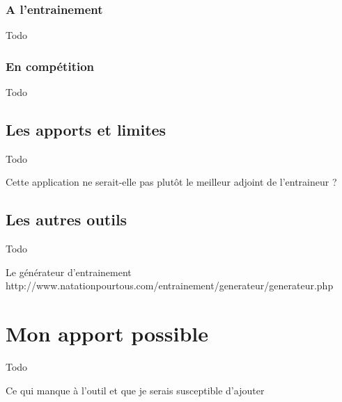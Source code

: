 \subsubsection{A l’entrainement}

Todo


\subsubsection{En compétition}

Todo


\subsection{Les apports et limites}

Todo


Cette application ne serait-elle pas plutôt le meilleur adjoint de l'entraineur ?


\subsection{Les autres outils}

Todo

Le générateur d'entrainement
http://www.natationpourtous.com/entrainement/generateur/generateur.php


\clearpage
\section{Mon apport possible}

Todo

Ce qui manque à l'outil et que je serais susceptible d'ajouter
